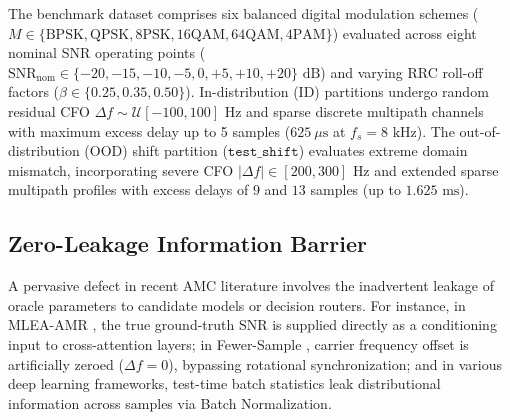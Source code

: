 The benchmark dataset comprises six balanced digital modulation schemes ($M \in \{\text{BPSK}, \text{QPSK}, \text{8PSK}, \text{16QAM}, \text{64QAM}, \text{4PAM}\}$) evaluated across eight nominal SNR operating points ($\text{SNR}_{\text{nom}} \in \{-20, -15, -10, -5, 0, +5, +10, +20\}\text{ dB}$) and varying RRC roll-off factors ($\beta \in \{0.25, 0.35, 0.50\}$). In-distribution (ID) partitions undergo random residual CFO $\Delta f \sim \mathcal{U}[-100, 100]\text{ Hz}$ and sparse discrete multipath channels with maximum excess delay up to 5 samples ($625\ \mu\text{s}$ at $f_s = 8\text{ kHz}$). The out-of-distribution (OOD) shift partition ($\texttt{test\_shift}$) evaluates extreme domain mismatch, incorporating severe CFO $|\Delta f| \in [200, 300]\text{ Hz}$ and extended sparse multipath profiles with excess delays of $9$ and $13$ samples (up to $1.625\text{ ms}$).

\subsection{Zero-Leakage Information Barrier}
\label{subsec:zero_leakage}

A pervasive defect in recent AMC literature involves the inadvertent leakage of oracle parameters to candidate models or decision routers. For instance, in MLEA-AMR \cite{gao2026mlea}, the true ground-truth SNR is supplied directly as a conditioning input to cross-attention layers; in Fewer-Sample \cite{guo2025fewer}, carrier frequency offset is artificially zeroed ($\Delta f = 0$), bypassing rotational synchronization; and in various deep learning frameworks, test-time batch statistics leak distributional information across samples via Batch Normalization.

